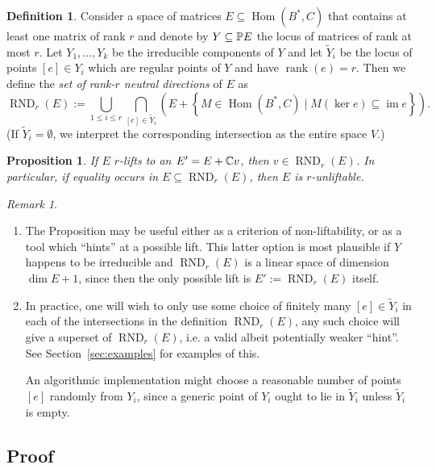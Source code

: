 \documentclass[a4paper,10pt]{article}
\def\zav#1{\left(#1\right)}
\def\set#1{\left\{#1\right\}}
\DeclareMathOperator{\Hom}{Hom}\let\hom\Hom
\DeclareMathOperator{\rank}{rank}\let\rk\rank
\DeclareMathOperator{\im}{im}
\DeclareMathOperator{\RND}{RND}
\def\uv#1{``#1''}
\newtheorem{prop}[theorem]{Proposition}
\theoremstyle{definition}
\newtheorem{definition}[theorem]{Definition}
\theoremstyle{remark}
\newtheorem*{remark}{Remark}
\begin{document}
\begin{definition}
    Consider a space of matrices $E\subseteq \Hom(B^*,C)$ that contains at least one matrix of rank $r$ and denote by $Y\subseteq \pe E$ the locus of matrices of rank at most $r$. Let $Y_1,\dots, Y_k$ be the irreducible components of $Y$ and let $\tilde Y_i$ be the locus of points $[e]\in Y_i$ which are regular points of $Y$ and have $\rank(e) = r$.  Then we define the \emph{set of rank-$r$ neutral directions} of $E$ as
    \[
        \RND_r(E) := \bigcup_{1\leq i\leq r} \bigcap_{[e]\in \tilde Y_i} \zav{E + \set{M\in \Hom(B^*,C)\mid M(\ker e)\subseteq \im e}}.
    \]
    (If $\tilde Y_i=\emptyset$, we interpret the corresponding intersection as the entire space $V$.)
\end{definition}
%
\begin{prop}
    \label{prp:main-liftability}
    If $E$ $r$-lifts to an $E'=E+\ce v$, then $v\in \RND_r(E)$. In particular, if equality occurs in  $E\subseteq \RND_r(E)$, then $E$ is $r$-unliftable.
\end{prop}
\begin{remark}
    \begin{enumerate}
        \item The Proposition may be useful either as a criterion of non-liftability, or as a tool which \uv{hints} at a possible lift. This latter option is most plausible if $Y$ happens to be irreducible and $\RND_r(E)$ is a linear space of dimension $\dim E+1$, since then the only possible lift is $E':=\RND_r(E)$ itself.
        \item In practice, one will wish to only use some choice of finitely many $[e]\in\tilde Y_i$ in each of the intersections in the definition $\RND_r(E)$, any such choice will give a superset of $\RND_r(E)$, i.e. a valid albeit potentially weaker \uv{hint}. See Section~\ref{sec:examples} for examples of this.

        An algorithmic implementation might choose a reasonable number of points $[e]$ randomly from $Y_i$, since a generic point of $Y_i$ ought to lie in $\tilde Y_i$ unless $\tilde Y_i$ is empty.
    \end{enumerate}
\end{remark}


\subsection{Proof}
\end{document}
